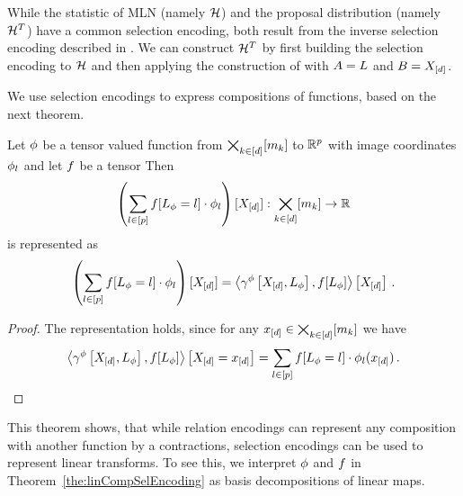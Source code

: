 \begin{example}
    While the statistic of MLN (namely $\mathcal{H}$) and the proposal distribution (namely $\mathcal{H}^T$) have a common selection encoding, both result from the inverse selection encoding described in .
    We can construct $\mathcal{H}^T$ by first building the selection encoding to $\mathcal{H}$ and then applying the construction of  with $A=L$ and $B=X_{[d]}$.
\end{example}


We use selection encodings to express compositions of functions, based on the next theorem.

\begin{theorem}
    \label{the:linCompSelEncoding}
    Let $\phi$ be a tensor valued function from $\bigtimes_{k\in[d]}[m_{k}]$ to $\mathbb{R}^{p}$ with image coordinates $\phi_l$ and let $f$ be a tensor
    Then
    \[ \left(\sum_{l\in[p]}f[L_{\phi}=l]\cdot \phi_l \right) [X_{[d]}] : \bigtimes_{k\in[d]}[m_{k}] \rightarrow \mathbb{R} \]
    is represented as
    \[ \left(\sum_{l\in[p]}f[L_{\phi}=l]\cdot \phi_l \right) [X_{[d]}]
    = \left\langle \gamma^{\phi}\left[X_{[d]},L_{\phi}\right] , f[L_{\phi}]\right\rangle \left[ X_{[d]} \right] \, . \]
\end{theorem}
\begin{proof}
    The representation holds, since for any $x_{[d]}\in\bigtimes_{k\in[d]}[m_{k}]$ we have
    \begin{align*}
        \left\langle \gamma^{\phi}\left[X_{[d]},L_{\phi}\right] , f[L_{\phi}]\right\rangle \left[ X_{[d]}=x_{[d]} \right]
        = \sum_{l\in[p]}f[L_{\phi}=l]\cdot\phi_l(x_{[d]}) \, .
    \end{align*}
\end{proof}

This theorem shows, that while relation encodings can represent any composition with another function by a contractions, selection encodings can be used to represent linear transforms.
To see this, we interpret $\phi$ and $f$ in Theorem~\ref{the:linCompSelEncoding} as basis decompositions of linear maps.

